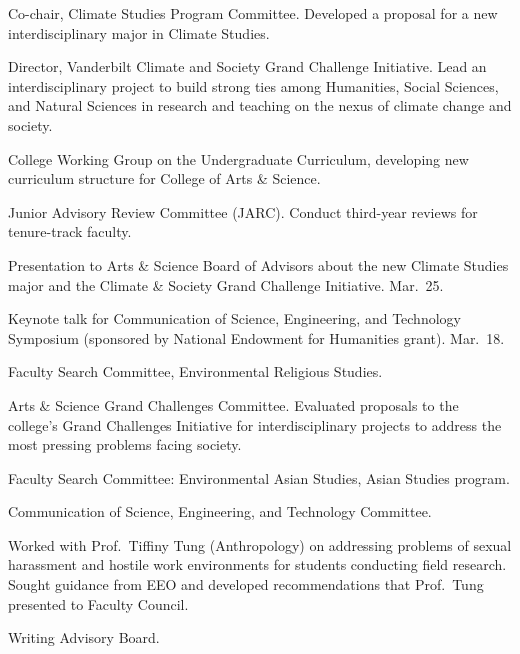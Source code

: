 \item[2021--present] Co-chair, Climate Studies Program Committee.
  Developed a proposal for a new interdisciplinary major in Climate Studies.
\item[2020--present] Director, Vanderbilt Climate and Society Grand Challenge
  Initiative. Lead an interdisciplinary project to build strong ties among
  Humanities, Social Sciences, and Natural Sciences in research and teaching on
  the nexus of climate change and society.
\item[2022--2023] College Working Group on the Undergraduate Curriculum,
developing new curriculum structure for College of Arts \& Science.
\item[2020--2022] Junior Advisory Review Committee (JARC).
  Conduct third-year reviews for tenure-track faculty.
\item[2022] Presentation to Arts \& Science Board of Advisors about the new
  Climate Studies major and the Climate \& Society Grand Challenge Initiative.
  Mar.~25.
\item[2022] Keynote talk for Communication of Science, Engineering, and
  Technology Symposium (sponsored by National Endowment for Humanities grant).
  Mar.~18.
\item[2021--2022] Faculty Search Committee, Environmental Religious Studies.
\item[2019--2020] Arts \& Science Grand Challenges Committee.
  Evaluated proposals to the college's Grand Challenges Initiative for
  interdisciplinary projects to address the most pressing problems facing
  society.
\item[2019--2020] Faculty Search Committee: Environmental Asian Studies, Asian Studies program.
\item[2003--2018] Communication of Science, Engineering, and Technology Committee.
\item[2014--2015] Worked with Prof.\ Tiffiny Tung (Anthropology) on addressing problems of sexual harassment and hostile work environments for students conducting field research. Sought guidance from EEO and developed recommendations that Prof.\ Tung presented to Faculty Council.
\item[2004--2009] Writing Advisory Board.
